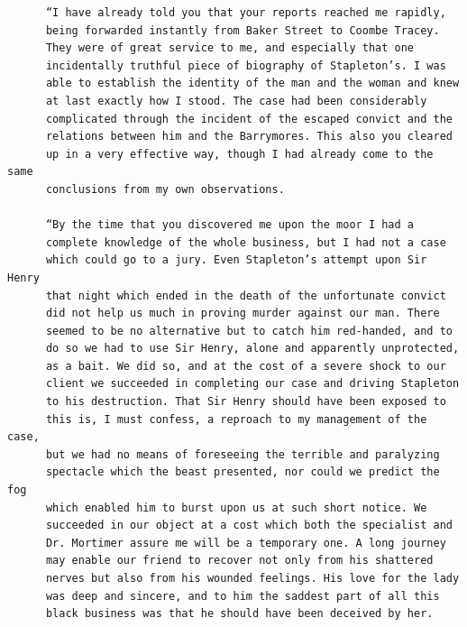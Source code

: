 \documentclass{article}
\begin{document}
\begin{verbatim}
      “I have already told you that your reports reached me rapidly,
      being forwarded instantly from Baker Street to Coombe Tracey.
      They were of great service to me, and especially that one
      incidentally truthful piece of biography of Stapleton’s. I was
      able to establish the identity of the man and the woman and knew
      at last exactly how I stood. The case had been considerably
      complicated through the incident of the escaped convict and the
      relations between him and the Barrymores. This also you cleared
      up in a very effective way, though I had already come to the same
      conclusions from my own observations.

      “By the time that you discovered me upon the moor I had a
      complete knowledge of the whole business, but I had not a case
      which could go to a jury. Even Stapleton’s attempt upon Sir Henry
      that night which ended in the death of the unfortunate convict
      did not help us much in proving murder against our man. There
      seemed to be no alternative but to catch him red-handed, and to
      do so we had to use Sir Henry, alone and apparently unprotected,
      as a bait. We did so, and at the cost of a severe shock to our
      client we succeeded in completing our case and driving Stapleton
      to his destruction. That Sir Henry should have been exposed to
      this is, I must confess, a reproach to my management of the case,
      but we had no means of foreseeing the terrible and paralyzing
      spectacle which the beast presented, nor could we predict the fog
      which enabled him to burst upon us at such short notice. We
      succeeded in our object at a cost which both the specialist and
      Dr. Mortimer assure me will be a temporary one. A long journey
      may enable our friend to recover not only from his shattered
      nerves but also from his wounded feelings. His love for the lady
      was deep and sincere, and to him the saddest part of all this
      black business was that he should have been deceived by her.


\end{verbatim}
\end{document}
